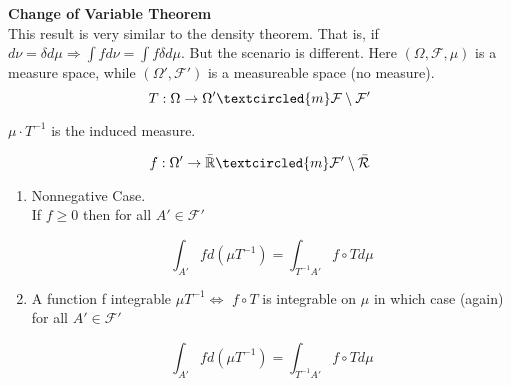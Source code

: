 \documentclass[11pt,fleqn]{book} %
\begin{document}
\textbf{Change of Variable Theorem}\\


This result is very similar to the density theorem.  That is, if $d\nu = \delta d\mu \Rightarrow \int f d\nu = \int f \delta d\mu$. But the scenario is different. Here $(\Omega, \mathcal{F}, \mu)$ is a measure space, while $(\Omega', \mathcal{F}')$ is a measureable space (no measure). \\

		$$ T: \Omega \rightarrow \Omega' \textcircled{m} \mathcal{F}\setminus\mathcal{F}'$$

$\mu \cdot T^{-1} $ is the induced measure. 

		$$ f: \Omega' \rightarrow \bar{\mathbb{R}} \textcircled{m} \mathcal{F}'\setminus\bar{\mathcal{R}} $$

\begin{theorem}
	\begin{enumerate}
		\item Nonnegative Case. \\

			If $f \geq 0$ then for all $A' \in \mathcal{F}'$

					$$\int_{A'} f d(\mu T^{-1}) = \int_{T^{-1}A'} f \circ T d\mu$$
		
		\item A function f integrable $\mu T^{-1} \Leftrightarrow$ $f \circ T$ is integrable on $\mu$ in which case (again) for all $A' \in \mathcal{F}'$

					$$\int_{A'} f d(\mu T^{-1}) = \int_{T^{-1}A'} f \circ T d\mu$$
	\end{enumerate}
\end{theorem}
\end{document}
